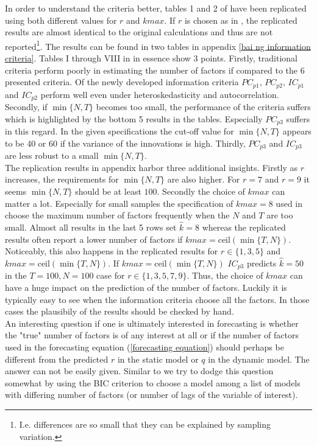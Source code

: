 \documentclass[12pt]{article}
\begin{document}
In order to understand the criteria better, tables 1 and 2 of \citet{bai2002determining} have been replicated using both different values for $r$ and $kmax$. If $r$ is chosen as in \citet{bai2002determining}, the replicated results are almost identical to the original calculations and thus are not reported\footnote{I.e. differences are so small that they can be explained by sampling variation.}. The results can be found in two tables in appendix \ref{bai ng information criteria}. Tables I through VIII in \citet{bai2002determining} in essence show $3$ points. Firstly, traditional criteria perform poorly in estimating the number of factors if compared to the $6$ presented criteria. Of the newly developed information criteria $PC_{p1}$, $PC_{p2}$, $IC_{p1}$ and $IC_{p2}$ perform well even under heteroskedasticity and autocorrelation. Secondly, if $\min\{N, T\}$ becomes too small, the performance of the criteria suffers which is highlighted by the bottom 5 results in the tables. Especially $PC_{p3}$ suffers in this regard. In the given specifications the cut-off value for $\min\{N, T\}$ appears to be 40 or 60 if the variance of the innovations is high. Thirdly, $PC_{p3}$ and $IC_{p3}$ are less robust to a small $\min\{N, T\}$. \\
The replication results in appendix \citet{bai2002determining} harbor three additional insights. Firstly as $r$ increases, the requirements for $\min\{N, T\}$ are also higher. For $r=7$ and $r=9$ it seems $\min\{N, T\}$ should be at least $100$. Secondly the choice of $kmax$ can matter a lot. Especially for small samples the specification of $kmax=8$ used in \citet{bai2002determining} choose the maximum number of factors frequently when the $N$ and $T$ are too small. Almost all results in the last 5 rows set $\hat k=8$ whereas the replicated results often report a lower number of factors if $kmax=\text{ceil}(\min\{T, N\})$. Noticeably, this also happens in the replicated results for $r \in \{1, 3, 5\}$ and $kmax=\text{ceil}(\min\{T, N\})$. If $kmax=\text{ceil}(\min\{T, N\})$ $IC_{p3}$ predicts $\hat k=50$ in the $T=100, N=100$ case for $r \in \{1, 3, 5, 7, 9\}$. Thus, the choice of $kmax$ can have a huge impact on the prediction of the number of factors. Luckily it is typically easy to see when the information criteria choose all the factors. In those cases the plausibily of the results should be checked by hand. \\

An interesting question if one is ultimately interested in forecasting is whether the "true" number of factors is of any interest at all or if the number of factors used in the forecasting equation (\ref{forecasting equation}) should perhaps be different from the predicted $r$ in the static model or $q$ in the dynamic model. The answer can not be easily given. Similar to \citet{bai2008forecasting} we try to dodge this question somewhat by using the BIC criterion to choose a model among a list of models with differing number of factors (or number of lags of the variable of interest).
\end{document}
